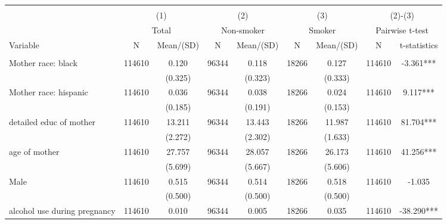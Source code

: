 
\begin{tabular}{@{\extracolsep{5pt}}lcccccccc}
\\[-1.8ex]\hline \hline \\[-1.8ex]
 & \multicolumn{2}{c}{(1)}  & \multicolumn{2}{c}{(2)}  & \multicolumn{2}{c}{(3)}  & \multicolumn{2}{c}{(2)-(3)} \\
 & \multicolumn{2}{c}{Total}  & \multicolumn{2}{c}{Non-smoker}  & \multicolumn{2}{c}{Smoker}  & \multicolumn{2}{c}{Pairwise t-test}  \\
Variable & N & Mean/(SD) & N & Mean/(SD) & N & Mean/(SD) & N & t-statistics \\ \hline \\[-1.8ex] 
Mother race: black   & 114610    & 0.120    & 96344    & 0.118    & 18266    & 0.127    & 114610    & -3.361***   \\
 &   & (0.325)  &   & (0.323)  &   & (0.333)  &   &  \\ [1ex]
Mother race: hispanic   & 114610    & 0.036    & 96344    & 0.038    & 18266    & 0.024    & 114610    & 9.117***   \\
 &   & (0.185)  &   & (0.191)  &   & (0.153)  &   &  \\ [1ex]
detailed educ of mother   & 114610    & 13.211    & 96344    & 13.443    & 18266    & 11.987    & 114610    & 81.704***   \\
 &   & (2.272)  &   & (2.302)  &   & (1.633)  &   &  \\ [1ex]
age of mother   & 114610    & 27.757    & 96344    & 28.057    & 18266    & 26.173    & 114610    & 41.256***   \\
 &   & (5.699)  &   & (5.667)  &   & (5.606)  &   &  \\ [1ex]
Male   & 114610    & 0.515    & 96344    & 0.514    & 18266    & 0.518    & 114610    & -1.035   \\
 &   & (0.500)  &   & (0.500)  &   & (0.500)  &   &  \\ [1ex]
alcohol use during pregnancy   & 114610    & 0.010    & 96344    & 0.005    & 18266    & 0.035    & 114610    & -38.290***   \\

\end{tabular}

